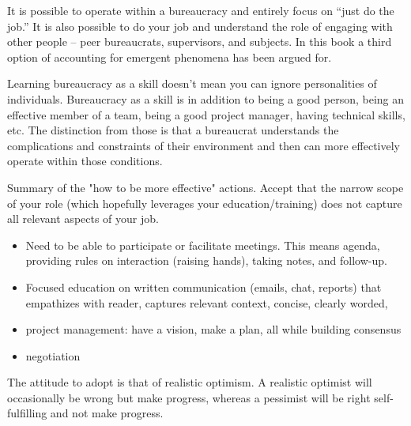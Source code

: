 It is possible to operate within a bureaucracy and entirely focus on ``just do the job.'' It is also possible to do your job and understand the role of engaging with other people -- peer bureaucrats, supervisors, and subjects. In this book a third option of accounting for emergent phenomena has been argued for. 

Learning bureaucracy as a skill doesn't mean you can ignore personalities of individuals. Bureaucracy as a skill is in addition to being a good person, being an effective member of a team, being a good project manager, having technical skills, etc. The distinction from those is that a bureaucrat understands the complications and constraints of their environment and then can more effectively operate within those conditions.


Summary of the "how to be more effective" actions.
Accept that the narrow scope of your role (which hopefully leverages your education/training) does not capture all relevant aspects of your job.
\begin{itemize}
    \item Need to be able to participate or facilitate meetings. This means agenda, providing rules on interaction (raising hands), taking notes, and follow-up.
    \item Focused education on written communication (emails, chat, reports) that empathizes with reader, captures relevant context, concise, clearly worded, 
    \item project management: have a vision, make a plan, all while building consensus
    \item negotiation
\end{itemize}

The attitude to adopt is that of realistic optimism. A realistic optimist will occasionally be wrong but make progress, whereas a pessimist will be right self-fulfilling and not make progress.